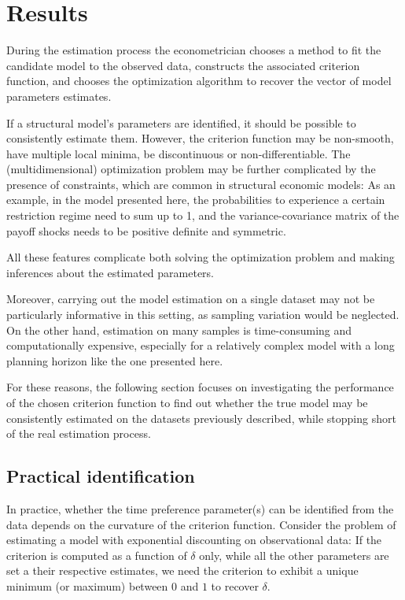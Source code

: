 

\section{Results} \label{results}

During the estimation process the econometrician chooses a method to fit the candidate model to the observed data, constructs the associated criterion function, and chooses the optimization algorithm to recover the vector of model parameters estimates. 

If a structural model's parameters are identified, it should be possible to consistently estimate them. However, the criterion function may be non-smooth, have multiple local minima, be discontinuous or non-differentiable. The (multidimensional) optimization problem may be further complicated by the presence of constraints, which are common in structural economic models: As an example, in the model presented here, the probabilities to experience a certain restriction regime need to sum up to 1, and the variance-covariance matrix of the payoff shocks needs to be positive definite and symmetric. 

All these features complicate both solving the optimization problem and making inferences about the estimated parameters. 

Moreover, carrying out the model estimation on a single dataset may not be particularly informative in this setting, as sampling variation would be neglected. On the other hand, estimation on many samples is time-consuming and computationally expensive, especially for a relatively complex model with a long planning horizon like the one presented here.

For these reasons, the following section focuses on investigating the performance of the chosen criterion function to find out whether the true model may be consistently estimated on the datasets previously described, while stopping short of the real estimation process. 

\subsection{Practical identification}

In practice, whether the time preference parameter(s) can be identified from the data depends on the curvature of the criterion function. Consider the problem of estimating a model with exponential discounting on observational data: If the criterion is computed as a function of $\delta$ only, while all the other parameters are set a their respective estimates, we need the criterion to exhibit a unique minimum (or maximum) between $0$ and $1$ to recover $\delta$.

